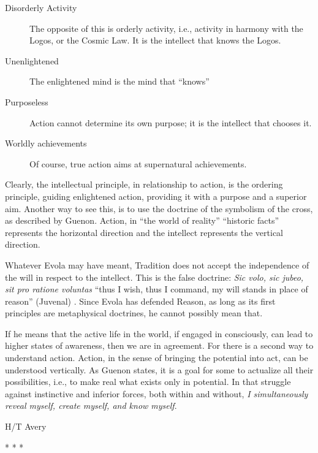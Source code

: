 \begin{description}

\item[Disorderly Activity]

The opposite of this is orderly activity, i.e., activity in harmony with the Logos, or the Cosmic Law. It is the intellect that knows the Logos.
\item[Unenlightened]

The enlightened mind is the mind that ``knows''
\item[Purposeless]

Action cannot determine its own purpose; it is the intellect that chooses it.
\item[Worldly achievements]

Of course, true action aims at supernatural achievements.
\end{description}


Clearly, the intellectual principle, in relationship to action, is the ordering principle, guiding enlightened action, providing it with a purpose and a superior aim. Another way to see this, is to use the doctrine of the symbolism of the cross, as described by Guenon. Action, in ``the world of reality'' ``historic facts'' represents the horizontal direction and the intellect represents the vertical direction.

Whatever Evola may have meant, Tradition does not accept the independence of the will in respect to the intellect. This is the false doctrine: \emph{Sic volo, sic jubeo, sit pro ratione voluntas} ``thus I wish, thus I command, my will stands in place of reason'' (Juvenal) . Since Evola has defended Reason, as long as its first principles are metaphysical doctrines, he cannot possibly mean that.

If he means that the active life in the world, if engaged in consciously, can lead to higher states of awareness, then we are in agreement. For there is a second way to understand action. Action, in the sense of bringing the potential into act, can be understood vertically. As Guenon states, it is a goal for some to actualize all their possibilities, i.e., to make real what exists only in potential. In that struggle against instinctive and inferior forces, both within and without, \emph{I simultaneously reveal myself, create myself, and know myself}.

H/T Avery



\begin{center}* * *\end{center}

